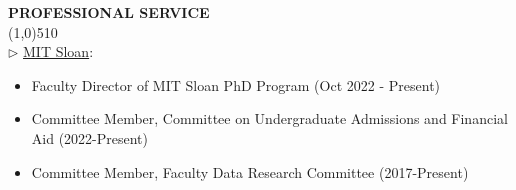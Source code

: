 \documentclass[11pt]{article}
\begin{document}

\vskip 0.5cm
\setlength{\parindent}{0in}
{\bf PROFESSIONAL SERVICE\\}
\vskip -0.85cm \line(1,0){510} \\ \vskip -0.15cm
$\triangleright$ \underline{MIT Sloan}:
\vspace*{-.07in}
\begin{itemize}
  \item Faculty Director of MIT Sloan PhD Program (Oct 2022 - Present)
\vspace*{-.07in}
    \item Committee Member, Committee on Undergraduate Admissions and Financial Aid (2022-Present)
\vspace*{-.07in}
		\item Committee Member, Faculty Data Research Committee (2017-Present)
	\end{itemize}

\end{document}

